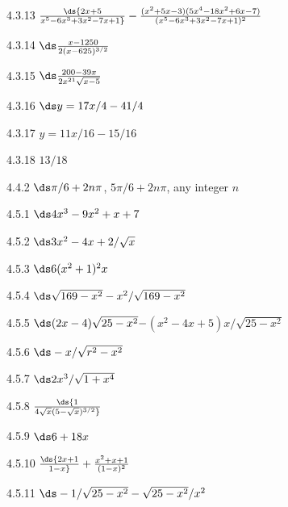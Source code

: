 \begin{Answer}{4.3.13}
$\ds {2x+5\over x^5-6x^3+3x^2-7x+1}-{(x^2+5x-3)(5x^4-18x^2+6x-7)\over(x^5-6x^3+3x^2-7x+1)^2}$
\end{Answer}
\begin{Answer}{4.3.14}
$\ds \frac{x-1250}{2(x-625)^{3/2}}$
\end{Answer}
\begin{Answer}{4.3.15}
$\ds \frac{200-39x}{2x^{21}\sqrt{x-5}}$
\end{Answer}
\begin{Answer}{4.3.16}
$\ds y=17x/4-41/4$
\end{Answer}
\begin{Answer}{4.3.17}
$y=11x/16-15/16$
\end{Answer}
\begin{Answer}{4.3.18}
$13/18$
\end{Answer}
\begin{Answer}{4.4.2}
$\ds \pi/6+2n\pi$, $5\pi/6+2n\pi$, any integer $n$
\end{Answer}
\begin{Answer}{4.5.1}
$\ds 4x^3-9x^2+x+7$
\end{Answer}
\begin{Answer}{4.5.2}
$\ds 3x^2-4x+2/\sqrt{x}$
\end{Answer}
\begin{Answer}{4.5.3}
$\ds 6(x^2+1)^2x$
\end{Answer}
\begin{Answer}{4.5.4}
$\ds \sqrt{169-x^2}-x^2/\sqrt{169-x^2}$
\end{Answer}
\begin{Answer}{4.5.5}
$\ds  (2x-4)\sqrt{25-x^2}-$\hfill\break$(x^2-4x+5)x/\sqrt{25-x^2}$
\end{Answer}
\begin{Answer}{4.5.6}
$\ds -x/\sqrt{r^2-x^2}$
\end{Answer}
\begin{Answer}{4.5.7}
$\ds 2x^3/\sqrt{1+x^4}$
\end{Answer}
\begin{Answer}{4.5.8}
$\ds{1\over 4\sqrt{x}(5-\sqrt{x})^{3/2}}$
\end{Answer}
\begin{Answer}{4.5.9}
$\ds  6+18x$
\end{Answer}
\begin{Answer}{4.5.10}
$\ds {2 x + 1\over1 - x }+{x^2  + x + 1\over(1 - x)^2}$
\end{Answer}
\begin{Answer}{4.5.11}
$\ds  -1/\sqrt{25-x^2}-\sqrt{25-x^2}/x^2$
\end{Answer}
